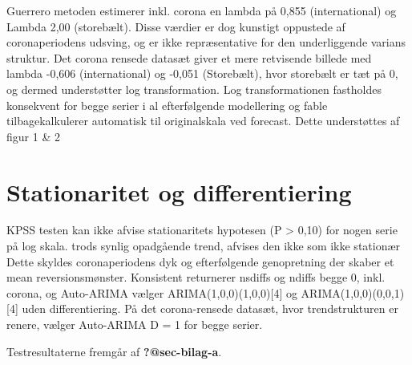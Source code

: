\documentclass[
  danish,
]{article}
\begin{document}
Guerrero metoden estimerer inkl. corona en lambda på 0,855
(international) og Lambda 2,00 (storebælt). Disse værdier er dog
kunstigt oppustede af coronaperiodens udsving, og er ikke repræsentative
for den underliggende varians struktur. Det corona rensede datasæt giver
et mere retvisende billede med lambda -0,606 (international) og -0,051
(Storebælt), hvor storebælt er tæt på 0, og dermed understøtter log
transformation. Log transformationen fastholdes konsekvent for begge
serier i al efterfølgende modellering og fable tilbagekalkulerer
automatisk til originalskala ved forecast. Dette understøttes af figur 1
\& 2

\section{Stationaritet og
differentiering}\label{stationaritet-og-differentiering}

KPSS testen kan ikke afvise stationaritets hypotesen (P \textgreater{}
0,10) for nogen serie på log skala. trods synlig opadgående trend,
afvises den ikke som ikke stationær Dette skyldes coronaperiodens dyk og
efterfølgende genopretning der skaber et mean reversionsmønster.
Konsistent returnerer nsdiffs og ndiffs begge 0, inkl. corona, og
Auto-ARIMA vælger ARIMA(1,0,0)(1,0,0){[}4{]} og
ARIMA(1,0,0)(0,0,1){[}4{]} uden differentiering. På det corona-rensede
datasæt, hvor trendstrukturen er renere, vælger Auto-ARIMA D = 1 for
begge serier.

Testresultaterne fremgår af \textbf{?@sec-bilag-a}.

\newpage
\end{document}
